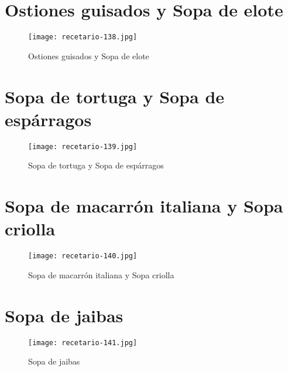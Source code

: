 \documentclass[12pt,letterpaper]{article}
\begin{document}
\newpage

\section{Ostiones guisados y Sopa de elote}
  \begin{figure}[H]
    \vspace{2pt}
  \texttt{[image: recetario-138.jpg]}
    \caption{Ostiones guisados y Sopa de elote}
    
  \end{figure}

\newpage

\section{Sopa de tortuga y Sopa de espárragos}
  \begin{figure}[H]
    \vspace{2pt}
  \texttt{[image: recetario-139.jpg]}
    \caption{Sopa de tortuga y Sopa de espárragos}
    
  \end{figure}


\newpage

\section{Sopa de macarrón italiana y Sopa criolla}
  \begin{figure}[H]
    \vspace{2pt}
  \texttt{[image: recetario-140.jpg]}
    \caption{Sopa de macarrón italiana y Sopa criolla}
    
  \end{figure}

\newpage

\section{Sopa de jaibas}
  \begin{figure}[H]
    \vspace{2pt}
  \texttt{[image: recetario-141.jpg]}
    \caption{Sopa de jaibas}
    
  \end{figure}


\newpage
\end{document}
